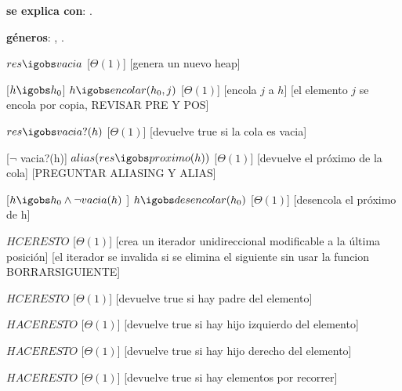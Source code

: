 \begin{Interfaz}

  \textbf{se explica con}: .

  \textbf{g\'eneros}: , .



  {$res \igobs vacia$}%
  [$\Theta(1)$]
  [genera un nuevo heap]


  [$h \igobs h_{0}$]
  {$h \igobs encolar(h_{0}, j)$}
  [$\Theta(1)$]
  [encola $j$ a $h$]
  [el elemento $j$ se encola por copia, REVISAR PRE Y POS]

  {$res \igobs vacia?(h)$}
  [$\Theta(1)$]
  [devuelve true si la cola es vacia]


  [$\neg$ vacia?(h)]  
  {$alias(res \igobs proximo(h))$} 
  [$\Theta(1)$]
  [devuelve el pr\'oximo de la cola]
  [PREGUNTAR ALIASING Y ALIAS]
  
  
  [$h \igobs h_{0} \land \neg vacia(h)$ ]  
  {$h \igobs desencolar(h_{0})$} 
  [$\Theta(1)$]
  [desencola el pr\'oximo de h]


  
  {$HCER ESTO$}%
  [$\Theta(1)$]
  [crea un iterador unidireccional modificable a la \'ultima posici\'on]
  [el iterador se invalida si se elimina el siguiente sin usar la funcion BORRARSIGUIENTE]
 
 
  {$HCER ESTO$}
  [$\Theta(1)$]
  [devuelve true si hay padre del elemento]
  
  {$HACER ESTO$}
  [$\Theta(1)$]
  [devuelve true si hay hijo izquierdo del elemento]
  
  {$HACER ESTO$}
  [$\Theta(1)$]
  [devuelve true si hay hijo derecho del elemento]
  
  {$HACER ESTO$}
  [$\Theta(1)$]
  [devuelve true si hay elementos por recorrer]
  

\end{Interfaz}
